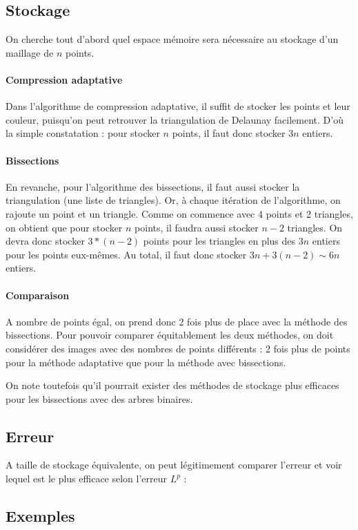\documentclass{report}
\begin{document}
\subsection{Stockage}

On cherche tout d'abord quel espace mémoire sera nécessaire au stockage d'un maillage de $n$ points.

\paragraph{Compression adaptative}

Dans l'algorithme de compression adaptative, il suffit de stocker les points et leur couleur, puisqu'on peut retrouver la triangulation de Delaunay facilement. D'où la simple constatation : pour stocker $n$ points, il faut donc stocker $3n$ entiers.

\paragraph{Bissections}

En revanche, pour l'algorithme des bissections, il faut aussi stocker la triangulation (une liste de triangles). Or, à chaque itération de l'algorithme, on rajoute un point et un triangle. Comme on commence avec 4 points et 2 triangles, on obtient que pour stocker $n$ points, il faudra aussi stocker $n-2$ triangles. On devra donc stocker $3*(n-2)$ points pour les triangles en plus des $3n$ entiers pour les points eux-mêmes. Au total, il faut donc stocker $3n + 3(n-2) \sim 6n$ entiers.

\paragraph{Comparaison}

A nombre de points égal, on prend donc 2 fois plus de place avec la méthode des bissections. Pour pouvoir comparer équitablement les deux méthodes, on doit considérer des images avec des nombres de points différents : 2 fois plus de points pour la méthode adaptative que pour la méthode avec bissections.

On note toutefois qu'il pourrait exister des méthodes de stockage plus efficaces pour les bissections avec des arbres binaires.

\subsection{Erreur}

A taille de stockage équivalente, on peut légitimement comparer l'erreur et voir lequel est le plus efficace selon l'erreur $L^p$ :

\subsection{Exemples}
\end{document}
